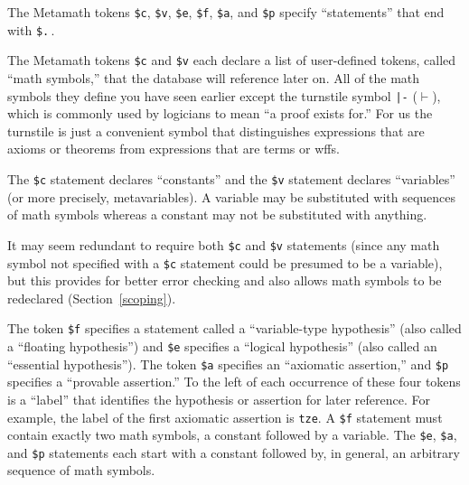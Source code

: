 The Metamath tokens \texttt{\$c},
\texttt{\$v},
\texttt{\$e},
\texttt{\$f},
\texttt{\$a}, and
\texttt{\$p} specify ``statements'' that
end with \texttt{\$.}\,.

The Metamath tokens \texttt{\$c} and \texttt{\$v} each declare a list of user-defined tokens, called
``math symbols,'' that the database will reference later
on.  All of the math symbols they define you have seen earlier except the
turnstile symbol \texttt{|-} ($\vdash$), which is
commonly used by logicians to mean ``a proof exists for.''  For us
the turnstile is just a
convenient symbol that distinguishes expressions that are axioms
or theorems from expressions that are terms or wffs.

The \texttt{\$c} statement declares ``constants'' and
the \texttt{\$v} statement declares
``variables'' (or more precisely, metavariables).  A
variable may be substituted with sequences of math symbols whereas a constant may not
be substituted with anything.

It may seem redundant to require both \texttt{\$c} and
\texttt{\$v} statements (since any math
symbol not specified with a \texttt{\$c} statement could be
presumed to be a variable), but this provides for better error checking and
also allows math symbols to be redeclared
(Section~\ref{scoping}).

The token \texttt{\$f} specifies a
statement called a ``variable-type hypothesis'' (also called a
``floating hypothesis'') and \texttt{\$e}
specifies a ``logical hypothesis'' (also called an ``essential
hypothesis''). The token
\texttt{\$a} specifies an ``axiomatic
assertion,'' and
\texttt{\$p} specifies a ``provable
assertion.'' To the left of each occurrence of
these four tokens is a ``label'' that identifies the
hypothesis or assertion for later reference.  For example, the label of
the first axiomatic assertion is \texttt{tze}.  A \texttt{\$f} statement
must contain exactly two math symbols, a constant followed by a
variable.  The \texttt{\$e}, \texttt{\$a}, and \texttt{\$p} statements
each start with a constant followed by, in general, an arbitrary
sequence of math symbols.


